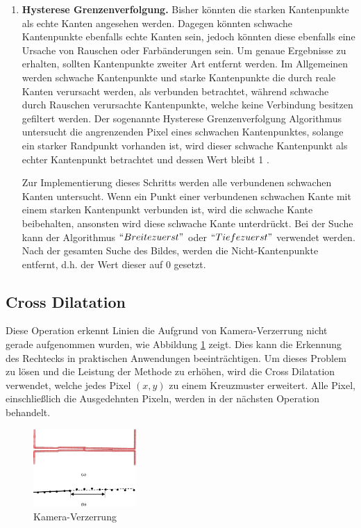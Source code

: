 \begin{enumerate}
	\item \textbf{Hysterese Grenzenverfolgung.} Bisher könnten die starken Kantenpunkte als echte Kanten angesehen werden. Dagegen könnten schwache Kantenpunkte ebenfalls echte Kanten sein, jedoch könnten diese ebenfalls eine Ursache von Rauschen oder Farbänderungen sein. Um genaue Ergebnisse zu erhalten, sollten Kantenpunkte zweiter Art entfernt werden. Im Allgemeinen werden schwache Kantenpunkte und starke Kantenpunkte die durch reale Kanten verursacht werden, als verbunden betrachtet, während schwache durch Rauschen verursachte Kantenpunkte, welche keine Verbindung besitzen gefiltert werden. Der sogenannte Hysterese Grenzenverfolgung Algorithmus untersucht die angrenzenden Pixel eines schwachen Kantenpunktes, solange ein starker Randpunkt vorhanden ist, wird dieser schwache Kantenpunkt als echter Kantenpunkt betrachtet und dessen Wert bleibt 1 .
	
Zur Implementierung dieses Schritts werden alle verbundenen schwachen Kanten untersucht. Wenn ein Punkt einer verbundenen schwachen Kante mit einem starken Kantenpunkt verbunden ist, wird die schwache Kante beibehalten, ansonsten wird diese schwache Kante unterdrückt. Bei der Suche kann der Algorithmus $ ``Breite zuerst" $ oder $ ``Tiefe zuerst" $ verwendet werden. Nach der gesamten Suche des Bildes, werden die Nicht-Kantenpunkte entfernt, d.h. der Wert dieser auf 0 gesetzt.
	
\end{enumerate}


\subsection{Cross Dilatation}

Diese Operation erkennt Linien die Aufgrund von Kamera-Verzerrung nicht gerade aufgenommen wurden, wie Abbildung \ref{Kamera Verzerrung} zeigt. Dies kann die Erkennung des Rechtecks in praktischen Anwendungen beeinträchtigen. Um dieses Problem zu lösen und die Leistung der Methode zu erhöhen, wird die Cross Dilatation verwendet, welche jedes Pixel $ (x,y) $ zu einem Kreuzmuster erweitert. Alle Pixel, einschließlich die Ausgedehnten Pixeln, werden in der nächsten Operation behandelt. 

\begin{figure}[H]
 \centering 
  \includegraphics[keepaspectratio,width=0.35\textwidth]{images/4_ZweiteErfahrung/cd/cd2.pdf}
 \caption{Kamera-Verzerrung \cite{6005853}}
 \label{Kamera Verzerrung}
\end{figure}

